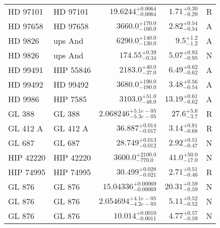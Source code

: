 \begin{longtable*}{llrrr}
HD 97101 & HD 97101 & $19.6244^{+0.0064}_{-0.0064}$ & $1.71^{+0.30}_{-0.29}$ & R \\
HD 97658 & HD 97658 & $3660.0^{+170.0}_{-160.0}$ & $2.82^{+0.54}_{-0.54}$ & A \\
HD 9826 & ups And & $6290.0^{+140.0}_{-130.0}$ & $9.5^{+1.2}_{-1.2}$ & A \\
HD 9826 & ups And & $174.55^{+0.39}_{-0.34}$ & $5.07^{+0.93}_{-0.95}$ & N \\
HD 99491 & HIP 55846 & $2183.0^{+40.0}_{-37.0}$ & $6.49^{+0.62}_{-0.62}$ & A \\
HD 99492 & HD 99492 & $3680.0^{+190.0}_{-180.0}$ & $3.48^{+0.56}_{-0.54}$ & A \\
HD 9986 & HIP 7585 & $3103.0^{+51.0}_{-48.0}$ & $13.19^{+0.61}_{-0.62}$ & A \\
GL 388 & GL 388 & $2.068246^{+5.1e-05}_{-5.3e-05}$ & $27.6^{+5.6}_{-3.7}$ & R \\
GL 412 A & GL 412 A & $36.887^{+0.014}_{-0.017}$ & $3.14^{+0.81}_{-0.68}$ & R \\
GL 687 & GL 687 & $28.749^{+0.013}_{-0.012}$ & $2.92^{+0.51}_{-0.47}$ & N \\
HIP 42220 & HIP 42220 & $3600.0^{+2100.0}_{-770.0}$ & $41.0^{+50.0}_{-17.0}$ & N \\
HIP 74995 & HIP 74995 & $30.499^{+0.028}_{-0.021}$ & $2.71^{+0.51}_{-0.46}$ & R \\
GL 876 & GL 876 & $15.04336^{+0.00069}_{-0.00069}$ & $20.31^{+0.59}_{-0.59}$ & N \\
GL 876 & GL 876 & $2.054694^{+4.1e-05}_{-4.2e-05}$ & $5.11^{+0.52}_{-0.52}$ & N \\
GL 876 & GL 876 & $10.014^{+0.0010}_{-0.0011}$ & $4.77^{+0.57}_{-0.59}$ & N \\
\bottomrule
\end{longtable*}
